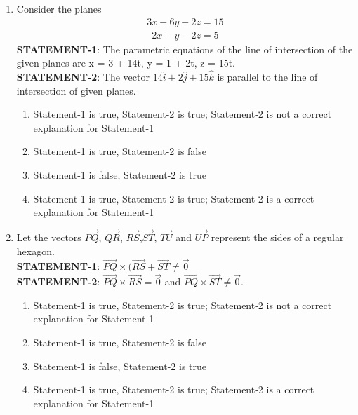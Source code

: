 \begin{enumerate}[label=\arabic*.,ref=\thesubsection.\theenumi]
\item Consider the planes 
\begin{align*}
3x - 6y - 2z = 15
\end{align*}
\begin{align*} 
2x + y - 2z = 5
\end{align*}
\textbf{STATEMENT-1}: The parametric equations of the line of intersection of the given planes are x = 3 + 14t, y = 1 + 2t, z = 15t.\\
\textbf{STATEMENT-2}: The vector $14\hat{i} + 2\hat{j} + 15\hat{k}$ is parallel to the line of intersection of given planes.
\begin{enumerate}
\item Statement-1 is true, Statement-2 is true; Statement-2 is not a correct explanation for Statement-1
\item Statement-1 is true, Statement-2 is false
\item Statement-1 is false, Statement-2 is true
\item Statement-1 is true, Statement-2 is true; Statement-2 is a correct explanation for Statement-1
\end{enumerate}

\item Let the vectors $\overrightarrow{PQ}$, $\overrightarrow{QR}$, $\overrightarrow{RS}$,$\overrightarrow{ST}$, $\overrightarrow{TU}$ and $\overrightarrow{UP}$ represent the sides of a regular hexagon.\\
\textbf{STATEMENT-1}: $\overrightarrow{PQ} \times (\overrightarrow{RS} + \overrightarrow{ST} \neq \overrightarrow{0}$\\
\textbf{STATEMENT-2}: $\overrightarrow{PQ} \times \overrightarrow{RS} = \overrightarrow{0}$ and $\overrightarrow{PQ} \times \overrightarrow{ST} \neq \overrightarrow{0}$.
\begin{enumerate}
\item Statement-1 is true, Statement-2 is true; Statement-2 is not a correct explanation for Statement-1
\item Statement-1 is true, Statement-2 is false
\item Statement-1 is false, Statement-2 is true
\item Statement-1 is true, Statement-2 is true; Statement-2 is a correct explanation for Statement-1
\end{enumerate}


\end{enumerate}

